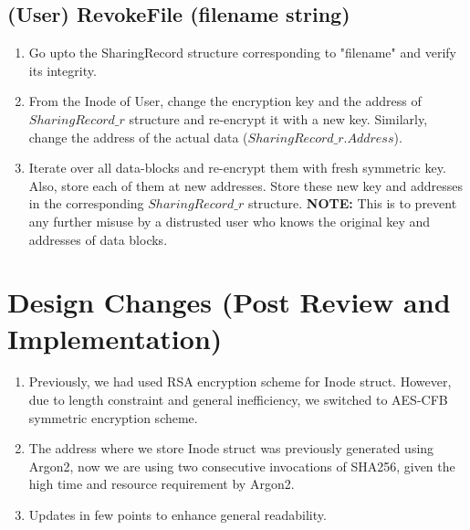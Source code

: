 \documentclass[a4paper, 12pt]{scrartcl}
\begin{document}
\subsection{(User) RevokeFile (filename string)}
\begin{enumerate}
	\itemsep0em
	\item Go upto the SharingRecord structure corresponding to "filename" and verify its integrity.
	\item From the Inode of User, change the encryption key and the address of $SharingRecord\_r$ structure and re-encrypt it with a new key. Similarly, change the address of the actual data ($SharingRecord\_r.Address$).
	\item Iterate over all data-blocks and re-encrypt them with fresh symmetric key. Also, store each of them at new addresses. Store these new key and addresses in the corresponding $SharingRecord\_r$ structure. \textbf{NOTE:} This is to prevent any further misuse by a distrusted user who knows the original key and addresses of data blocks.
\end{enumerate}

\section*{Design Changes (Post Review and Implementation)}

\begin{enumerate}
	\itemsep0em
	\item Previously, we had used RSA encryption scheme for Inode struct. However, due to length constraint and general inefficiency, we switched to AES-CFB symmetric encryption scheme.  
	\item The address where we store Inode struct was previously generated using Argon2, now we are using two consecutive invocations of SHA256, given the high time and resource requirement by Argon2.
	\item Updates in few points to enhance general readability. 
\end{enumerate}
\end{document}
